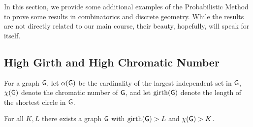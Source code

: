 In this section, we provide some additional examples of the
Probabilistic Method to prove some results in combinatorics and
discrete geometry. While the results are not directly related to our
main course, their beauty, hopefully, will speak for itself.


\subsection{High Girth and High Chromatic Number}

\begin{defn}
    For a graph $\mathsf{G}$, let $\alpha(\mathsf{G})$ be the cardinality of
    the largest independent set in $\mathsf{G}$, $\chi(\mathsf{G})$ denote the
    chromatic number of $\mathsf{G}$, and let $\mathop{\mathrm{girth}}(\mathsf{G})$ denote the
    length of the shortest circle in $\mathsf{G}$.
\end{defn}

\begin{theorem}
    For all $K, L$ there exists a graph $\mathsf{G}$ with $\mathop{\mathrm{girth}}(\mathsf{G})
    > L$ and $\chi(\mathsf{G}) > K$.
\end{theorem}

